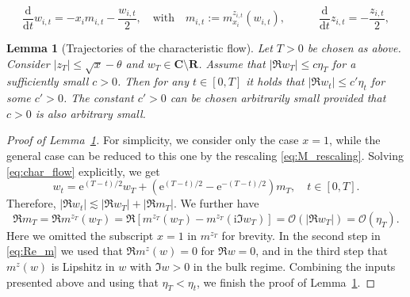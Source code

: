 \documentclass[10pt,a4paper]{amsart}
\newtheorem{lemma}{Lemma}
\newcommand{\C}{\mathbf{C}}
\newcommand{\R}{\mathbf{R}}
\newcommand{\dif}{\mathrm{d}}
\newcommand{\ee}{\mathrm{e}}
\newcommand{\ii}{\mathrm{i}}
\begin{document}
\begin{equation}
\frac{\dif}{\dif t} w_{i,t} = -x_i m_{i,t}-\frac{w_{i,t}}{2},\quad\text{with}\quad m_{i,t}:=m_{x_i}^{z_{i,t}}(w_{i,t}), \qquad\quad \frac{\dif}{\dif t} z_{i,t}=-\frac{z_{i,t}}{2},
\label{eq:char_flow}
\end{equation}

\begin{lemma}[Trajectories of the characteristic flow]\label{lem:trajectories} Let $T>0$ be chosen as above. Consider $|z_T|\le \sqrt{x}-\theta$ and $w_T\in\C\setminus\R$. Assume that $|\Re w_T|\le c\eta_T$ for a sufficiently small $c>0$.  Then for any $t\in [0,T]$ it holds that $|\Re w_t|\le c'\eta_t$ for some $c'>0$. The constant $c'>0$ can be chosen arbitrarily small provided that $c>0$ is also arbitrary small.
\end{lemma}

\begin{proof}[Proof of Lemma~\ref{lem:trajectories}] For simplicity, we consider only the case $x=1$, while the general case can be reduced to this one by the rescaling \eqref{eq:M_rescaling}. Solving \eqref{eq:char_flow} explicitly, we get 
\begin{equation}
w_t =\ee^{(T-t)/2}w_T +\left(\ee^{(T-t)/2}-\ee^{-(T-t)/2}\right) m_T,\quad t\in [0,T].
\label{eq:wt_eplicit}
\end{equation}
Therefore, $|\Re w_t|\lesssim |\Re w_T|+|\Re m_T|$. We further have
\begin{equation}
\Re m_T = \Re m^{z_T}(w_T) = \Re \left[ m^{z_T}(w_T)- m^{z_T}(\ii\Im w_T)\right] =\mathcal{O}\left(|\Re w_T|\right) =\mathcal{O}\left(\eta_T\right).
\label{eq:Re_m}
\end{equation}
Here we omitted the subscript $x=1$ in $m^{z_T}$ for brevity. In the second step in \eqref{eq:Re_m} we used that $\Re m^z(w)=0$ for $\Re w=0$, and in the third step that $m^z(w)$ is Lipshitz in $w$ with $\Im w>0$ in the bulk regime. Combining the inputs presented above and using that $\eta_T<\eta_t$, we finish the proof of Lemma~\ref{lem:trajectories}.
\end{proof}
\end{document}
